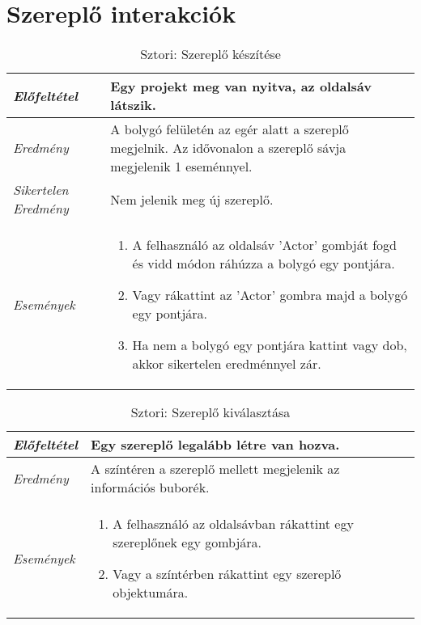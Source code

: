 \section{Szereplő interakciók}

\begin{table}[H]
	\centering
	\begin{tabular}{ | m{} | m{} | }
		\hline
		\emph{Előfeltétel} & Egy projekt meg van nyitva, az oldalsáv látszik.  \\
		\hline
		\emph{Eredmény} & A bolygó felületén az egér alatt a szereplő megjelnik. Az idővonalon a szereplő sávja megjelenik 1 eseménnyel.   \\
		\hline
		\emph{Sikertelen Eredmény} & Nem jelenik meg új szereplő.  \\
		\hline
		\hline
		\emph{Események} &

		\begin{enumerate}[itemsep=-1ex]
			\item A felhasználó az oldalsáv 'Actor' gombját fogd és vidd módon ráhúzza a bolygó egy pontjára.
			\item Vagy rákattint az 'Actor' gombra majd a bolygó egy pontjára.
			\item Ha nem a bolygó egy pontjára kattint vagy dob, akkor sikertelen eredménnyel zár.
		\end{enumerate}

		\\
		\hline
	\end{tabular}
	\caption{Sztori: Szereplő készítése}
	\label{tab:story-actor-create}
\end{table}

\begin{table}[H]
	\centering
	\begin{tabular}{ | m{} | m{} | }
		\hline
		\emph{Előfeltétel} & Egy szereplő legalább létre van hozva.  \\
		\hline
		\emph{Eredmény} & A színtéren a szereplő mellett megjelenik az információs buborék.   \\
		\hline
		\hline
		\emph{Események} &

		\begin{enumerate}[itemsep=-1ex]
			\item A felhasználó az oldalsávban rákattint egy szereplőnek egy gombjára.
			\item Vagy a színtérben rákattint egy szereplő objektumára.
		\end{enumerate}
		\\
		\hline
	\end{tabular}
	\caption{Sztori: Szereplő kiválasztása}
	\label{tab:story-actor-create}
\end{table}

